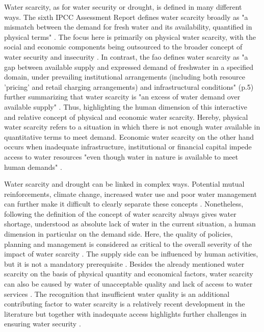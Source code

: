 Water scarcity, as for water security or drought, is defined in many different ways. The sixth IPCC Assessment Report defines water scarcity broadly as "a mismatch between the demand for fresh water and its availability, quantified in physical terms" \autocite[560]{caretta2022water}. The focus here is primarily on physical water scarcity, with the social and economic components being outsourced to the broader concept of water security and insecurity \autocite{caretta2022water}. In contrast, the \acrfull{fao} defines water scarcity as "a gap between available supply and expressed demand of freshwater in a specified domain, under prevailing institutional arrangements (including both resource 'pricing' and retail charging arrangements) and infrastructural conditions" (p.5) further summarizing that water scarcity is "an excess of water demand over available supply" \autocite[6]{faoCopingWaterScarcity2012}. Thus, highlighting the human dimension of this interactive and relative concept of physical and economic water scarcity. Hereby, physical water scarcity refers to a situation in which there is not enough water available in quantitative terms to meet demand. Economic water scarcity on the other hand occurs when inadequate infrastructure, institutional or financial capital impede access to water resources "even though water in nature is available to meet human demands" \autocites[11]{moldenWaterFoodWater2007}.

Water scarcity and drought can be linked in complex ways. Potential mutual reinforcements, climate change, increased water use and poor water management can further make it difficult to clearly separate these concepts \autocite{idmpDroughtWaterScarcity2022,lealfilhoUnderstandingResponsesClimaterelated2022,liuWaterScarcityAssessments2017,rcrcForecastbasedFinancingEarly2020}. Nonetheless, following the definition of \textcite{faoCopingWaterScarcity2012} the concept of water scarcity always gives water shortage, understood as absolute lack of water in the current situation, a human dimension in particular on the demand side. Here, the quality of policies, planning and management is considered as critical to the overall severity of the impact of water scarcity \autocite{idmpDroughtWaterScarcity2022,faoCopingWaterScarcity2012,undrrSpecialReportDrought2021}. The supply side can be influenced by human activities, but it is not a mandatory prerequisite \autocite{idmpDroughtWaterScarcity2022}.\newline
Besides the already mentioned water scarcity on the basis of physical quantity and economical factors, water scarcity can also be caused by water of unacceptable quality and lack of access to water services \autocite{faoCopingWaterScarcity2012}. The recognition that insufficient water quality is an additional contributing factor to water scarcity is a relatively recent development in the literature but together with inadequate access highlights further challenges in ensuring water security \autocite{caretta2022water, mishraWaterSecurityChanging2021,liuThreedimensionalWaterScarcity2020}. 

